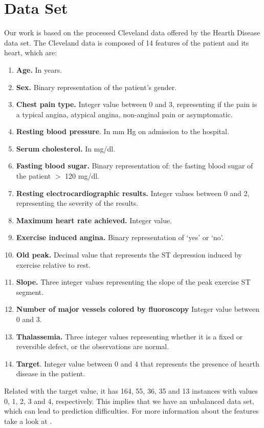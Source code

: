\section{Data Set}
Our work is based on the processed Cleveland data offered by the Hearth Disease data set. The Cleveland data is composed of 14 features of the patient and its heart, which are:
\begin{enumerate}
    \item \textbf{Age.} In years.
    \item \textbf{Sex.} Binary representation of the patient's gender.
    \item \textbf{Chest pain type.} Integer value between 0 and 3, representing if the pain is a typical angina, atypical angina, non-anginal pain or asymptomatic.
    \item \textbf{Resting blood pressure}. In mm Hg on admission to the hospital.
    \item \textbf{Serum cholesterol.} In mg/dl.
    \item \textbf{Fasting blood sugar.} Binary representation of: the fasting blood sugar of the patient $>$ 120 mg/dl.
    \item \textbf{Resting electrocardiographic results.} Integer values between 0 and 2, representing the severity of the results.
    \item \textbf{Maximum heart rate achieved.} Integer value.
    \item \textbf{Exercise induced angina.} Binary representation of `yes' or `no'.
    \item \textbf{Old peak.} Decimal value that represents the ST depression induced by exercise relative to rest.
    \item \textbf{Slope.} Three integer values representing the slope of the peak exercise ST segment.
    \item \textbf{Number of major vessels colored by fluoroscopy} Integer value between 0 and 3.
    \item \textbf{Thalassemia.} Three integer values representing whether it is a fixed or reversible defect, or the observations are normal.
    \item \textbf{Target}. Integer value between 0 and 4 that represents the presence of hearth disease in the patient.
\end{enumerate}
Related with the target value, it has 164, 55, 36, 35 and 13 instances with values 0, 1, 2, 3 and 4, respectively. This implies that we have an unbalanced data set, which can lead to prediction difficulties. For more information about the features take a look at \cite{dataset}.